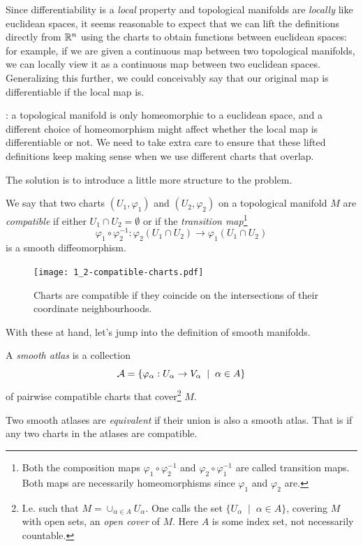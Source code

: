 Since differentiability is a \emph{local} property and topological manifolds are \emph{locally} like euclidean spaces, it seems reasonable to expect that we can lift the definitions directly from $\mathbb{R}^n$ using the charts to obtain functions between euclidean spaces:
for example, if we are given a continuous map between two topological manifolds, we can locally view it as a continuous map between two euclidean spaces.
Generalizing this further, we could conceivably say that our original map is differentiable if the local map is.

: a topological manifold is only homeomorphic to a euclidean space, and a different choice of homeomorphism might affect whether the local map is differentiable or not.
We need to take extra care to ensure that these lifted definitions keep making sense when we use different charts that overlap.

The solution is to introduce a little more structure to the problem.

\begin{definition}\label{def:crcomp}
  We say that two charts $(U_1, \varphi_1)$ and $(U_2, \varphi_2)$ on a topological manifold $M$ are \emph{compatible} if either $U_1 \cap U_2 = \emptyset$ or if the \emph{transition map}\footnote{Both the composition maps $\varphi_1 \circ \varphi_2^{-1}$ and $\varphi_2 \circ \varphi_1^{-1}$ are called transition maps. Both maps are necessarily homeomorphisms since $\varphi_1$ and $\varphi_2$ are.}
  \begin{equation}
    \varphi_1 \circ \varphi_2^{-1} : \varphi_2(U_1\cap U_2) \to \varphi_1(U_1 \cap U_2)
  \end{equation}
  is a smooth diffeomorphism.
\end{definition}

\begin{figure}[htp]
  \centering
  \texttt{[image: 1\_2-compatible-charts.pdf]}
  \caption{Charts are compatible if they coincide on the intersections of their coordinate neighbourhoods.}
  \label{fig:1.2-compatible-charts}
\end{figure}

With these at hand, let's jump into the definition of smooth manifolds.

\begin{definition}\label{def:cratlas}
  A \emph{smooth atlas} is a collection
  \begin{equation}
    \mathcal{A} = \{\varphi_\alpha: U_\alpha \to V_\alpha \;\mid\; \alpha\in A\}
  \end{equation}
  of pairwise compatible charts that cover\footnote{I.e. such that $M = \cup_{\alpha\in A} U_\alpha$. One calls the set $\{U_\alpha \;\mid\; \alpha\in A\}$, covering $M$ with open sets, an \emph{open cover} of $M$. Here $A$ is some index set, not necessarily countable.} $M$.

  Two smooth atlases are \emph{equivalent} if their union is also a smooth atlas. That is if any two charts in the atlases are compatible.
\end{definition}

